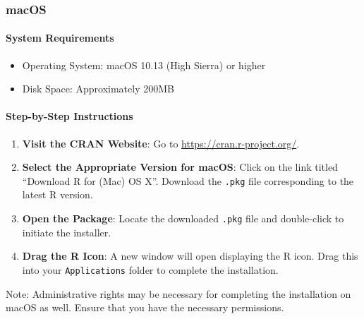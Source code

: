 \documentclass[
  b5paper]{book}
\newenvironment{Shaded}{\begin{snugshade}}{\end{snugshade}}
\newcommand{\NormalTok}[1]{#1}
\providecommand{\tightlist}{%
  \setlength{\itemsep}{0pt}\setlength{\parskip}{0pt}}
\begin{document}
\hypertarget{macos}{%
\subsubsection*{macOS}\label{macos}}

\hypertarget{system-requirements-1}{%
\paragraph*{System Requirements}\label{system-requirements-1}}

\begin{itemize}
\tightlist
\item
  Operating System: macOS 10.13 (High Sierra) or higher
\item
  Disk Space: Approximately 200MB
\end{itemize}

\hypertarget{step-by-step-instructions-1}{%
\paragraph*{Step-by-Step Instructions}\label{step-by-step-instructions-1}}

\begin{enumerate}
\def\labelenumi{\arabic{enumi}.}
\item
  \textbf{Visit the CRAN Website}: Go to \url{https://cran.r-project.org/}.
\item
  \textbf{Select the Appropriate Version for macOS}: Click on the link titled ``Download R for (Mac) OS X''. Download the \texttt{.pkg} file corresponding to the latest R version.
\item
  \textbf{Open the Package}: Locate the downloaded \texttt{.pkg} file and double-click to initiate the installer.
\item
  \textbf{Drag the R Icon}: A new window will open displaying the R icon. Drag this into your \texttt{Applications} folder to complete the installation.
\end{enumerate}

\begin{Shaded}
\begin{Highlighting}[]
\NormalTok{Note: Administrative rights may be necessary for completing the installation on macOS as well. Ensure that you have the necessary permissions.}
\end{Highlighting}
\end{Shaded}
\end{document}
